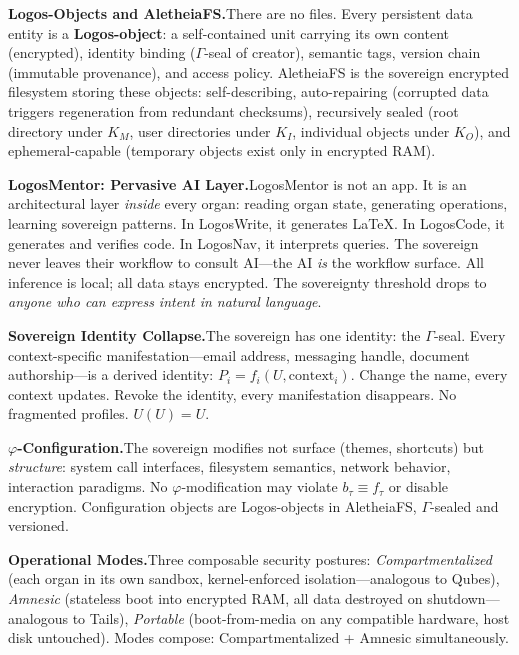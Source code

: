 \documentclass[11pt, oneside]{article}
\begin{document}
\medskip
\noindent\textbf{Logos-Objects and AletheiaFS.}\quad There are no files.
Every persistent data entity is a \textbf{Logos-object}: a
self-contained unit carrying its own content (encrypted), identity
binding ($\Gamma$-seal of creator), semantic tags, version chain
(immutable provenance), and access policy. AletheiaFS is the sovereign
encrypted filesystem storing these objects: self-describing,
auto-repairing (corrupted data triggers regeneration from redundant
checksums), recursively sealed (root directory under $K_M$, user
directories under $K_I$, individual objects under $K_O$), and
ephemeral-capable (temporary objects exist only in encrypted RAM).

\medskip
\noindent\textbf{LogosMentor: Pervasive AI Layer.}\quad LogosMentor is
not an app. It is an architectural layer \textit{inside} every organ:
reading organ state, generating operations, learning sovereign patterns.
In LogosWrite, it generates \LaTeX{}. In LogosCode, it generates and
verifies code. In LogosNav, it interprets queries. The sovereign never
leaves their workflow to consult AI---the AI \textit{is} the workflow
surface. All inference is local; all data stays encrypted. The
sovereignty threshold drops to \textit{anyone who can express intent in
natural language}.

\medskip
\noindent\textbf{Sovereign Identity Collapse.}\quad The sovereign has
one identity: the $\Gamma$-seal. Every context-specific
manifestation---email address, messaging handle, document
authorship---is a derived identity: $P_i = f_i(U, \text{context}_i)$.
Change the name, every context updates. Revoke the identity, every
manifestation disappears. No fragmented profiles. $U(U) = U$.

\medskip
\noindent\textbf{$\varphi$-Configuration.}\quad The sovereign modifies not surface (themes,
shortcuts) but \textit{structure}: system call interfaces, filesystem
semantics, network behavior, interaction paradigms.
No $\varphi$-modification may violate $b_\tau \equiv f_\tau$ or
disable encryption. Configuration objects are Logos-objects in
AletheiaFS, $\Gamma$-sealed and versioned.

\medskip
\noindent\textbf{Operational Modes.}\quad Three composable security
postures: \textit{Compartmentalized} (each organ in its own sandbox,
kernel-enforced isolation---analogous to Qubes), \textit{Amnesic}
(stateless boot into encrypted RAM, all data destroyed on
shutdown---analogous to Tails), \textit{Portable} (boot-from-media on
any compatible hardware, host disk untouched). Modes compose:
Compartmentalized + Amnesic simultaneously.
\end{document}
